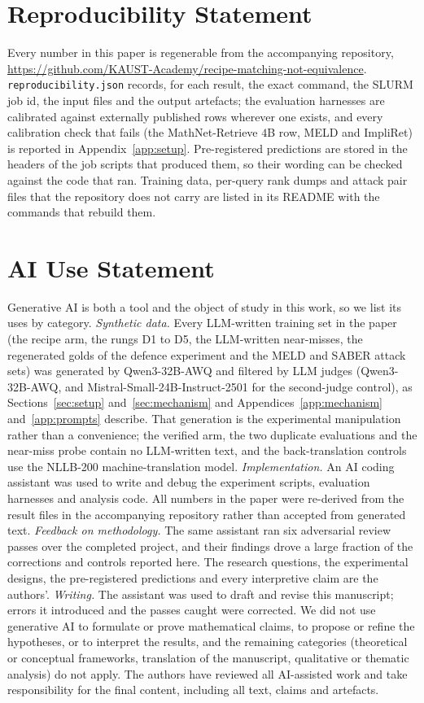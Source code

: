 \documentclass{article}
\newcommand{\repourl}{\url{https://github.com/KAUST-Academy/recipe-matching-not-equivalence}}
\begin{document}
\section*{Reproducibility Statement}
Every number in this paper is regenerable from the accompanying repository, \repourl. \texttt{reproducibility.json}
records, for each result, the exact command, the SLURM job id, the input files and the output
artefacts; the evaluation harnesses are calibrated against externally published rows wherever one
exists, and every calibration check that fails (the MathNet-Retrieve $4$B row, MELD and ImpliRet) is
reported in Appendix~\ref{app:setup}. Pre-registered predictions are stored in the headers of the job
scripts that produced them, so their wording can be checked against the code that ran. Training data,
per-query rank dumps and attack pair files that the repository does not carry are listed in its README
with the commands that rebuild them.

\section*{AI Use Statement}
Generative AI is both a tool and the object of study in this work, so we list its uses by
category. \emph{Synthetic data.} Every LLM-written training
set in the paper (the recipe arm, the rungs D1 to D5, the LLM-written near-misses, the regenerated
golds of the defence experiment and the MELD and SABER attack sets) was generated by Qwen3-32B-AWQ
and filtered by LLM judges (Qwen3-32B-AWQ, and Mistral-Small-24B-Instruct-2501 for the second-judge
control), as Sections~\ref{sec:setup} and~\ref{sec:mechanism} and Appendices~\ref{app:mechanism}
and~\ref{app:prompts} describe. That generation is the experimental manipulation rather than a
convenience; the verified arm, the two duplicate evaluations and the near-miss probe contain no
LLM-written text, and the back-translation controls use the NLLB-200 machine-translation model.
\emph{Implementation.} An AI coding assistant was used to write and debug the experiment scripts,
evaluation harnesses and analysis code. All numbers in the paper were re-derived from the result
files in the accompanying repository rather than accepted from generated text. \emph{Feedback on
methodology.} The same assistant ran six adversarial review passes over the completed project, and
their findings drove a large fraction of the corrections and controls reported here. The research
questions, the experimental designs, the pre-registered predictions and every interpretive claim are
the authors'. \emph{Writing.} The assistant was used to draft and revise this manuscript; errors it
introduced and the passes caught were corrected. We did not use generative AI to formulate or prove
mathematical claims, to propose or refine the hypotheses, or to interpret the results, and the
remaining categories (theoretical or conceptual frameworks, translation of the
manuscript, qualitative or thematic analysis) do not apply. The authors have reviewed all
AI-assisted work and take responsibility for the final content, including all text, claims and
artefacts.
\end{document}
